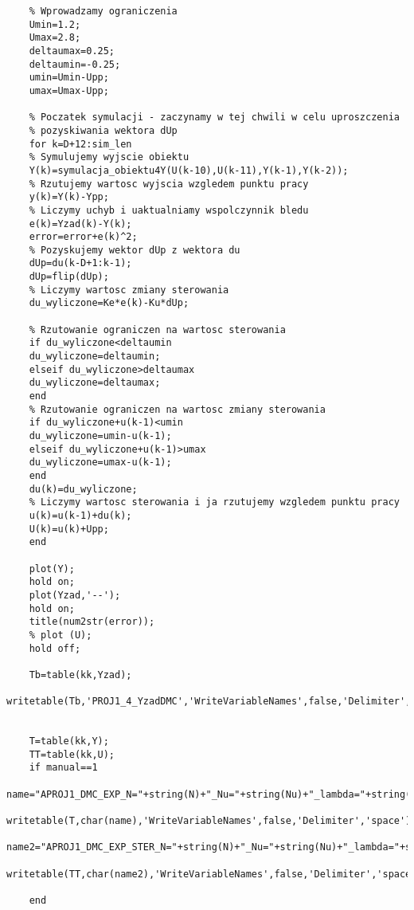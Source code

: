 \begin{lstlisting}
	% Wprowadzamy ograniczenia
	Umin=1.2;
	Umax=2.8;
	deltaumax=0.25;
	deltaumin=-0.25;
	umin=Umin-Upp;
	umax=Umax-Upp;
	
	% Poczatek symulacji - zaczynamy w tej chwili w celu uproszczenia
	% pozyskiwania wektora dUp
	for k=D+12:sim_len
	% Symulujemy wyjscie obiektu
	Y(k)=symulacja_obiektu4Y(U(k-10),U(k-11),Y(k-1),Y(k-2));
	% Rzutujemy wartosc wyjscia wzgledem punktu pracy
	y(k)=Y(k)-Ypp;
	% Liczymy uchyb i uaktualniamy wspolczynnik bledu
	e(k)=Yzad(k)-Y(k);
	error=error+e(k)^2;
	% Pozyskujemy wektor dUp z wektora du
	dUp=du(k-D+1:k-1);
	dUp=flip(dUp);
	% Liczymy wartosc zmiany sterowania
	du_wyliczone=Ke*e(k)-Ku*dUp;
	
	% Rzutowanie ograniczen na wartosc sterowania
	if du_wyliczone<deltaumin
	du_wyliczone=deltaumin;
	elseif du_wyliczone>deltaumax
	du_wyliczone=deltaumax;
	end
	% Rzutowanie ograniczen na wartosc zmiany sterowania
	if du_wyliczone+u(k-1)<umin
	du_wyliczone=umin-u(k-1);
	elseif du_wyliczone+u(k-1)>umax
	du_wyliczone=umax-u(k-1);
	end
	du(k)=du_wyliczone;
	% Liczymy wartosc sterowania i ja rzutujemy wzgledem punktu pracy
	u(k)=u(k-1)+du(k);
	U(k)=u(k)+Upp;
	end
	
	plot(Y);
	hold on;
	plot(Yzad,'--');
	hold on;
	title(num2str(error));
	% plot (U);
	hold off;
	
	Tb=table(kk,Yzad);
	writetable(Tb,'PROJ1_4_YzadDMC','WriteVariableNames',false,'Delimiter','space');
	
	
	T=table(kk,Y);
	TT=table(kk,U);
	if manual==1
	name="APROJ1_DMC_EXP_N="+string(N)+"_Nu="+string(Nu)+"_lambda="+string(lambda)+"error=_"+string(error)+".txt";
	writetable(T,char(name),'WriteVariableNames',false,'Delimiter','space');
	name2="APROJ1_DMC_EXP_STER_N="+string(N)+"_Nu="+string(Nu)+"_lambda="+string(lambda)+"error=_"+string(error)+".txt";
	writetable(TT,char(name2),'WriteVariableNames',false,'Delimiter','space');
	
	end
	
\end{lstlisting}
\centering
